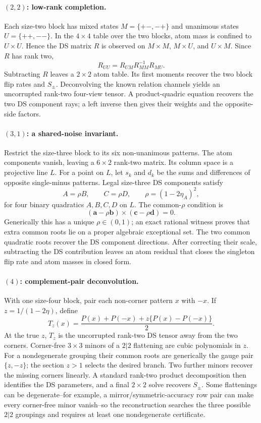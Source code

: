 \documentclass[11pt]{article}
\theoremstyle{definition}
\theoremstyle{remark}
\begin{document}
\paragraph{$(2,2)$: low-rank completion.}
Each size-two block has mixed states $M=\{+-, -+\}$ and unanimous states $U=\{++,--\}$. In the $4\times4$ table over the two blocks, atom mass is confined to $U\times U$. Hence the DS matrix $R$ is observed on $M\times M$, $M\times U$, and $U\times M$. Since $R$ has rank two,
\[
R_{UU}=R_{UM}R_{MM}^{-1}R_{MU}.
\]
Subtracting $R$ leaves a $2\times2$ atom table. Its first moments recover the two block flip rates and $S_\pm$. Deconvolving the known relation channels yields an uncorrupted rank-two four-view tensor. A product-quadric equation recovers the two DS component rays; a left inverse then gives their weights and the opposite-side factors.

\paragraph{$(3,1)$: a shared-noise invariant.}
Restrict the size-three block to its six non-unanimous patterns. The atom components vanish, leaving a $6\times2$ rank-two matrix. Its column space is a projective line $L$. For a point on $L$, let $s_k$ and $d_k$ be the sums and differences of opposite single-minus patterns. Legal size-three DS components satisfy
\[
A=\rho B,\qquad C=\rho D,
\qquad \rho=(1-2\eta_A)^2,
\]
for four binary quadratics $A,B,C,D$ on $L$. The common-$\rho$ condition is
\[
(\mathbf a-\rho\mathbf b)\times(\mathbf c-\rho\mathbf d)=0.
\]
Generically this has a unique $\rho\in(0,1)$; an exact rational witness proves that extra common roots lie on a proper algebraic exceptional set. The two common quadratic roots recover the DS component directions. After correcting their scale, subtracting the DS contribution leaves an atom residual that closes the singleton flip rate and atom masses in closed form.

\paragraph{$(4)$: complement-pair deconvolution.}
With one size-four block, pair each non-corner pattern $x$ with $-x$. If $z=1/(1-2\eta)$, define
\[
T_z(x)=\frac{P(x)+P(-x)+z\{P(x)-P(-x)\}}{2}.
\]
At the true $z$, $T_z$ is the uncorrupted rank-two DS tensor away from the two corners. Corner-free $3\times3$ minors of a $2|2$ flattening are cubic polynomials in $z$. For a nondegenerate grouping their common roots are generically the gauge pair $\{z,-z\}$; the section $z>1$ selects the desired branch. Two further minors recover the missing corners linearly. A standard rank-two product decomposition then identifies the DS parameters, and a final $2\times2$ solve recovers $S_\pm$. Some flattenings can be degenerate--for example, a mirror/symmetric-accuracy row pair can make every corner-free minor vanish--so the reconstruction searches the three possible $2|2$ groupings and requires at least one nondegenerate certificate.
\end{document}
